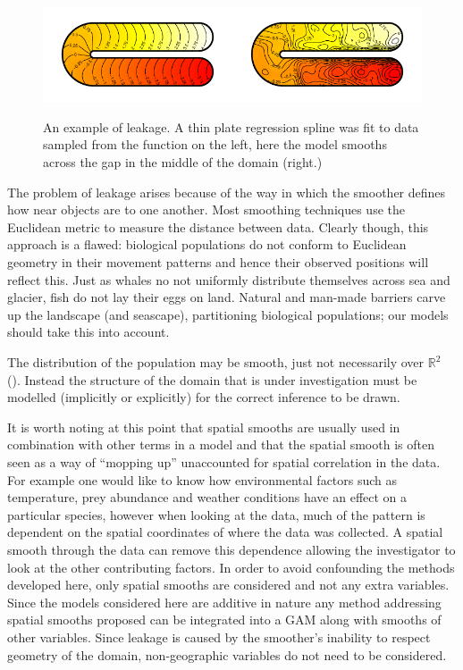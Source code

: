 \begin{figure}
\centering
\includegraphics{intro/figs/ramsay-leak.pdf}\\
\caption{An example of leakage. A thin plate regression spline was fit to data sampled from the function on the left, here the model smooths across the gap in the middle of the domain (right.)}
\label{leakage}
\end{figure}

The problem of leakage arises because of the way in which the smoother defines how near objects are to one another. Most smoothing techniques use the Euclidean metric to measure the distance between data. Clearly though, this approach is a flawed: biological populations do not conform to Euclidean geometry in their movement patterns and hence their observed positions will reflect this. Just as whales no not uniformly distribute themselves across sea and glacier, fish do not lay their eggs on land. Natural and man-made barriers carve up the landscape (and seascape), partitioning biological populations; our models should take this into account.

The distribution of the population may be smooth, just not necessarily over $\mathbb{R}^2$ (\cite{wangranalli}). Instead the structure of the domain that is under investigation must be modelled (implicitly or explicitly) for the correct inference to be drawn.

It is worth noting at this point that spatial smooths are usually used in combination with other terms in a model and that the spatial smooth is often seen as a way of ``mopping up'' unaccounted for spatial correlation in the data. For example one would like to know how environmental factors such as temperature, prey abundance and weather conditions have an effect on a particular species, however when looking at the data, much of the pattern is dependent on the spatial coordinates of where the data was collected. A spatial smooth through the data can remove this dependence allowing the investigator to look at the other contributing factors. In order to avoid confounding the methods developed here, only spatial smooths are considered and not any extra variables. Since the models considered here are additive in nature any method addressing spatial smooths proposed can be integrated into a GAM along with smooths of other variables. Since leakage is caused by the smoother's inability to respect geometry of the domain, non-geographic variables do not need to be considered.

